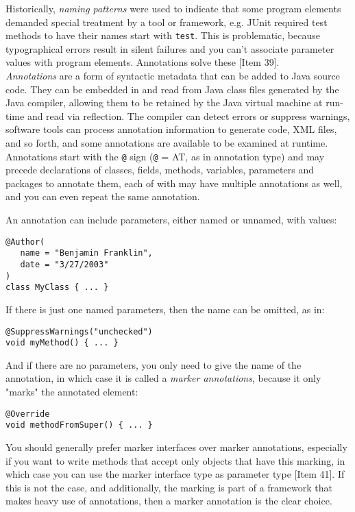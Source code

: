 \documentclass[8pt, table, xcdraw]{article}%
\begin{document}
Historically, \emph{naming patterns} were used to indicate that some program
elements demanded special treatment by a tool or framework, e.g. JUnit required test methods to have their names start with \lstinline{test}. This is problematic, because typographical errors result in silent failures and you can't associate parameter values with program elements. Annotations solve these [Item 39].\\
\emph{Annotations} are a form of syntactic metadata that can be added to Java source code. They can be embedded in and read from Java class files generated by the Java compiler, allowing them to be retained by the Java virtual machine at run-time and read via reflection. The compiler can detect errors or suppress warnings, software tools can process annotation information to generate code, XML files, and so forth, and some annotations are available to be examined at runtime. Annotations start with the \lstinline{@} sign (\lstinline{@} = AT, as in annotation type) and may precede declarations of classes, fields, methods, variables, parameters and packages to annotate them, each of with may have multiple annotations as well, and you can even repeat the same annotation.

An annotation can include parameters, either named or unnamed, with values:

\begin{lstlisting}
@Author(
   name = "Benjamin Franklin",
   date = "3/27/2003"
)
class MyClass { ... }
\end{lstlisting}

If there is just one named parameters, then the name can be omitted, as in:

\begin{lstlisting}
@SuppressWarnings("unchecked")
void myMethod() { ... }
\end{lstlisting}

And if there are no parameters, you only need to give the name of the annotation, in which case it is called a \emph{marker annotations}, because it only "marks" the annotated element:

\begin{lstlisting}
@Override
void methodFromSuper() { ... }
\end{lstlisting}

You should generally prefer marker interfaces over marker annotations, especially if you want to write methods that accept only objects that have this marking, in which case you can use the marker interface type as parameter type [Item 41]. If this is not the case, and additionally, the marking is part of a framework that makes heavy use of annotations, then a marker annotation is the clear choice.
\end{document}
